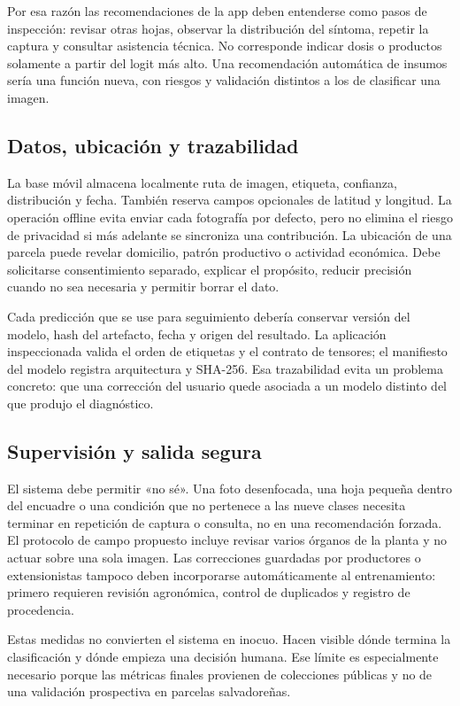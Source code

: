 Por esa razón las recomendaciones de la app deben entenderse como pasos de
inspección: revisar otras hojas, observar la distribución del síntoma, repetir
la captura y consultar asistencia técnica. No corresponde indicar dosis o
productos solamente a partir del logit más alto. Una recomendación automática
de insumos sería una función nueva, con riesgos y validación distintos a los de
clasificar una imagen.

\subsection{Datos, ubicación y trazabilidad}

La base móvil almacena localmente ruta de imagen, etiqueta, confianza,
distribución y fecha. También reserva campos opcionales de latitud y longitud.
La operación offline evita enviar cada fotografía por defecto, pero no elimina
el riesgo de privacidad si más adelante se sincroniza una contribución. La
ubicación de una parcela puede revelar domicilio, patrón productivo o actividad
económica. Debe solicitarse consentimiento separado, explicar el propósito,
reducir precisión cuando no sea necesaria y permitir borrar el dato.

Cada predicción que se use para seguimiento debería conservar versión del
modelo, hash del artefacto, fecha y origen del resultado. La aplicación
inspeccionada valida el orden de etiquetas y el contrato de tensores; el
manifiesto del modelo registra arquitectura y SHA-256. Esa trazabilidad evita
un problema concreto: que una corrección del usuario quede asociada a un modelo
distinto del que produjo el diagnóstico.

\subsection{Supervisión y salida segura}

El sistema debe permitir «no sé». Una foto desenfocada, una hoja pequeña dentro
del encuadre o una condición que no pertenece a las nueve clases necesita
terminar en repetición de captura o consulta, no en una recomendación forzada.
El protocolo de campo propuesto incluye revisar varios órganos de la planta y
no actuar sobre una sola imagen. Las correcciones guardadas por productores o
extensionistas tampoco deben incorporarse automáticamente al entrenamiento:
primero requieren revisión agronómica, control de duplicados y registro de
procedencia.

Estas medidas no convierten el sistema en inocuo. Hacen visible dónde termina
la clasificación y dónde empieza una decisión humana. Ese límite es
especialmente necesario porque las métricas finales provienen de colecciones
públicas y no de una validación prospectiva en parcelas salvadoreñas.
